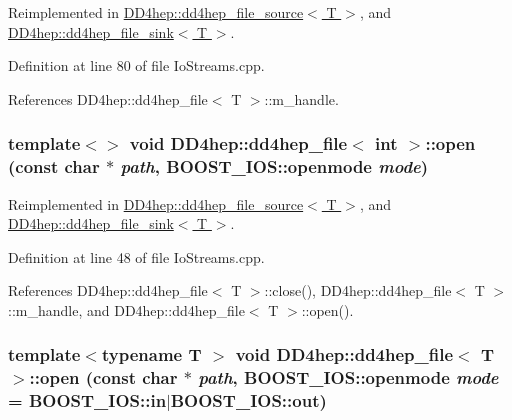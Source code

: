 Reimplemented in \hyperlink{class_d_d4hep_1_1dd4hep__file__source_ac9d66c792e2fa69fa7c9df98d8d45850}{DD4hep::dd4hep\_\-file\_\-source$<$ T $>$}, and \hyperlink{class_d_d4hep_1_1dd4hep__file__sink_aae7af8ee1e98ae89b380ddf2dc3f51f9}{DD4hep::dd4hep\_\-file\_\-sink$<$ T $>$}.

Definition at line 80 of file IoStreams.cpp.

References DD4hep::dd4hep\_\-file$<$ T $>$::m\_\-handle.\hypertarget{class_d_d4hep_1_1dd4hep__file_ada7adfd16dc7cb56bd904f8ac6d84bfb}{
\subsubsection[{open}]{\setlength{\rightskip}{0pt plus 5cm}template$<$$>$ void {\bf DD4hep::dd4hep\_\-file}$<$ int $>$::open (const char $\ast$ {\em path}, \/  BOOST\_\-IOS::openmode {\em mode})}}
\label{class_d_d4hep_1_1dd4hep__file_ada7adfd16dc7cb56bd904f8ac6d84bfb}


Reimplemented in \hyperlink{class_d_d4hep_1_1dd4hep__file__source_ac9d66c792e2fa69fa7c9df98d8d45850}{DD4hep::dd4hep\_\-file\_\-source$<$ T $>$}, and \hyperlink{class_d_d4hep_1_1dd4hep__file__sink_aae7af8ee1e98ae89b380ddf2dc3f51f9}{DD4hep::dd4hep\_\-file\_\-sink$<$ T $>$}.

Definition at line 48 of file IoStreams.cpp.

References DD4hep::dd4hep\_\-file$<$ T $>$::close(), DD4hep::dd4hep\_\-file$<$ T $>$::m\_\-handle, and DD4hep::dd4hep\_\-file$<$ T $>$::open().\hypertarget{class_d_d4hep_1_1dd4hep__file_a44e65364ed22ce152f237541e0391dcc}{
\subsubsection[{open}]{\setlength{\rightskip}{0pt plus 5cm}template$<$typename T $>$ void {\bf DD4hep::dd4hep\_\-file}$<$ {\bf T} $>$::open (const char $\ast$ {\em path}, \/  BOOST\_\-IOS::openmode {\em mode} = {\ttfamily BOOST\_\-IOS::in$|$BOOST\_\-IOS::out})}}
\label{class_d_d4hep_1_1dd4hep__file_a44e65364ed22ce152f237541e0391dcc}


